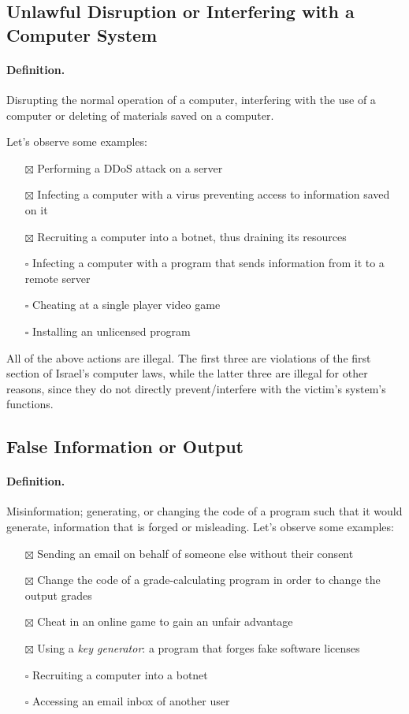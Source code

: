 \subsection{Unlawful Disruption or Interfering with a Computer System}

\paragraph{Definition.} Disrupting the normal operation of a computer,
interfering with the use of a computer or deleting of materials saved on a
computer.

Let's observe some examples:
\begin{itemize}
    \item[$\boxtimes$] Performing a DDoS attack on a server
    \item[$\boxtimes$] Infecting a computer with a virus preventing access to
    information saved on it
    \item[$\boxtimes$] Recruiting a computer into a botnet, thus draining its
    resources
    \item[$\square$] Infecting a computer with a program that sends information
    from it to a remote server
    \item[$\square$] Cheating at a single player video game
    \item[$\square$] Installing an unlicensed program
\end{itemize}

All of the above actions are illegal. The first three are violations of the
first section of Israel's computer laws, while the latter three are illegal for
other reasons, since they do not directly prevent/interfere with the victim's
system's functions.

\subsection{False Information or Output}

\paragraph{Definition.} Misinformation; generating, or changing the code of a
program such that it would generate, information that is forged or misleading.
Let's observe some examples:
\begin{itemize}
    \item[$\boxtimes$] Sending an email on behalf of someone else without their
    consent
    \item[$\boxtimes$] Change the code of a grade-calculating program in order
    to change the output grades
    \item[$\boxtimes$] Cheat in an online game to gain an unfair advantage
    \item[$\boxtimes$] Using a \textit{key generator}: a program that forges
    fake software licenses
    \item[$\square$] Recruiting a computer into a botnet
    \item[$\square$] Accessing an email inbox of another user
\end{itemize}

